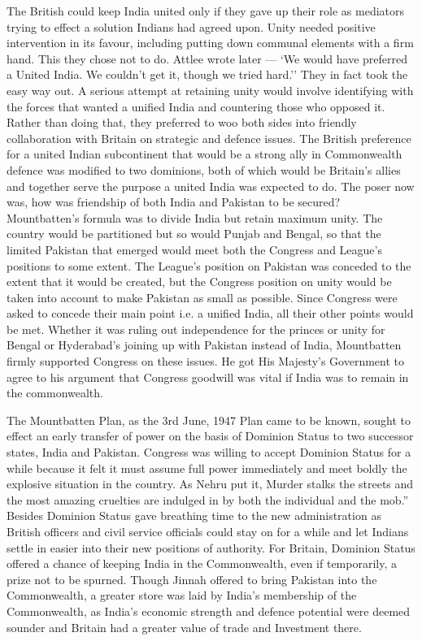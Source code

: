 \begin{multicols}{2}
The British could keep India united only if they gave up their role as mediators trying to effect a solution Indians had agreed upon. Unity needed positive intervention in its favour, including putting down communal elements with a firm hand. This they chose not to do. Attlee wrote later --- `We would have preferred a United India. We couldn't get it, though we tried hard.'' They in fact took the easy way out. A serious attempt at retaining unity would involve identifying with the forces that wanted a unified India and countering those who opposed it. Rather than doing that, they preferred to woo both sides into friendly collaboration with Britain on strategic and defence issues. The British preference for a united Indian subcontinent that would be a strong ally in Commonwealth defence was modified to two dominions, both of which would be Britain's allies and together serve the purpose a united India was expected to do. The poser now was, how was friendship of both India and Pakistan to be secured? Mountbatten's formula was to divide India but retain maximum unity. The country would be partitioned but so would Punjab and Bengal, so that the limited Pakistan that emerged would meet both the Congress and League's positions to some extent. The League's position on Pakistan was conceded to the extent that it would be created, but the Congress position on unity would be taken into account to make Pakistan as small as possible. Since Congress were asked to concede their main point i.e. a unified India, all their other points would be met. Whether it was ruling out independence for the princes or unity for Bengal or Hyderabad's joining up with Pakistan instead of India, Mountbatten firmly supported Congress on these issues. He got His Majesty's Government to agree to his argument that Congress goodwill was vital if India was to remain in the commonwealth. 

The Mountbatten Plan, as the 3rd June, 1947 Plan came to be known, sought to effect an early transfer of power on the basis of Dominion Status to two successor states, India and Pakistan. Congress was willing to accept Dominion Status for a while because it felt it must assume full power immediately and meet boldly the explosive situation in the country. As Nehru put it, Murder stalks the streets and the most amazing cruelties are indulged in by both the individual and the mob.'' Besides Dominion Status gave breathing time to the new administration as British officers and civil service officials could stay on for a while and let Indians settle in easier into their new positions of authority. For Britain, Dominion Status offered a chance of keeping India in the Commonwealth, even if temporarily, a prize not to be spurned. Though Jinnah offered to bring Pakistan into the Commonwealth, a greater store was laid by India's membership of the Commonwealth, as India's economic strength and defence potential were deemed sounder and Britain had a greater value of trade and Investment there. 


\end{multicols}
